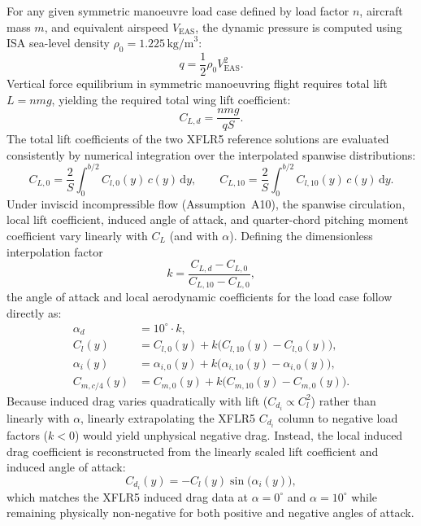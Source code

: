 For any given symmetric manoeuvre load case defined by load factor $n$, aircraft mass $m$, and equivalent airspeed $V_{\mathrm{EAS}}$, the dynamic pressure is computed using ISA sea-level density $\rho_0 = 1.225\,\text{kg/m}^3$:
\begin{equation}
    q = \frac{1}{2}\rho_0 V_{\mathrm{EAS}}^2.
    \label{eq:dynamic_pressure}
\end{equation}
Vertical force equilibrium in symmetric manoeuvring flight requires total lift $L = n m g$, yielding the required total wing lift coefficient:
\begin{equation}
    C_{L,d} = \frac{n m g}{q S}.
    \label{eq:CL_required}
\end{equation}
The total lift coefficients of the two XFLR5 reference solutions are evaluated consistently by numerical integration over the interpolated spanwise distributions:
\begin{equation}
    C_{L,0} = \frac{2}{S}\int_0^{b/2} C_{l,0}(y)\,c(y)\,\mathrm{d}y, \qquad
    C_{L,10} = \frac{2}{S}\int_0^{b/2} C_{l,10}(y)\,c(y)\,\mathrm{d}y.
    \label{eq:CL_ref_int}
\end{equation}
Under inviscid incompressible flow (Assumption~A10), the spanwise circulation, local lift coefficient, induced angle of attack, and quarter-chord pitching moment coefficient vary linearly with $C_L$ (and with $\alpha$). Defining the dimensionless interpolation factor
\begin{equation}
    k = \frac{C_{L,d} - C_{L,0}}{C_{L,10} - C_{L,0}},
    \label{eq:interp_k}
\end{equation}
the angle of attack and local aerodynamic coefficients for the load case follow directly as:
\begin{align}
    \alpha_d &= 10^\circ \cdot k, \label{eq:alpha_d} \\
    C_l(y) &= C_{l,0}(y) + k\bigl(C_{l,10}(y) - C_{l,0}(y)\bigr), \label{eq:Cl_y} \\
    \alpha_i(y) &= \alpha_{i,0}(y) + k\bigl(\alpha_{i,10}(y) - \alpha_{i,0}(y)\bigr), \label{eq:Ai_y} \\
    C_{m,c/4}(y) &= C_{m,0}(y) + k\bigl(C_{m,10}(y) - C_{m,0}(y)\bigr). \label{eq:Cm_y}
\end{align}
Because induced drag varies quadratically with lift ($C_{d_i} \propto C_l^2$) rather than linearly with $\alpha$, linearly extrapolating the XFLR5 $C_{d_i}$ column to negative load factors ($k < 0$) would yield unphysical negative drag. Instead, the local induced drag coefficient is reconstructed from the linearly scaled lift coefficient and induced angle of attack:
\begin{equation}
    C_{d_i}(y) = -C_l(y)\sin\bigl(\alpha_i(y)\bigr),
    \label{eq:Cdi_quad}
\end{equation}
which matches the XFLR5 induced drag data at $\alpha = 0^\circ$ and $\alpha = 10^\circ$ while remaining physically non-negative for both positive and negative angles of attack.

